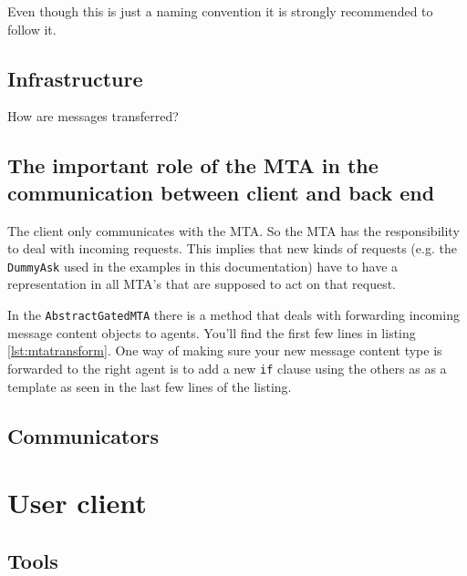 \documentclass[12pt]{book}
\newcommand{\lllhome}{../../../examples/src/main/java/de/unidue/inf/is/ezdl/examples/}
\begin{document}
Even though this is just a naming convention it is strongly recommended to follow it.





\section{Infrastructure}

How are messages transferred?



\section{The important role of the MTA in the communication between client and back end}

The client only communicates with the MTA. So the MTA has the responsibility to deal with incoming requests. This implies that new kinds of requests (e.g. the {\tt DummyAsk} used in the examples in this documentation) have to have a representation in all MTA's that are supposed to act on that request.

In the {\tt AbstractGatedMTA} there is a method that deals with forwarding incoming message content objects to agents. You'll find the first few lines in listing \ref{lst:mtatransform}. One way of making sure your new message content type is forwarded to the right agent is to add a new {\tt if} clause using the others as as a template as seen in the last few lines of the listing.





\section{Communicators}




%
%
%
%
%
\chapter{User client}

\section{Tools}
\end{document}
